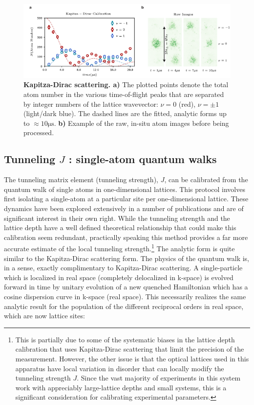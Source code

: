 \begin{figure}[t!]
		\includegraphics[width=\columnwidth]{figures/ch2/kapitza_dirac_latt_depth/KDCalv2edit.pdf} 
		\caption{\textbf{Kapitza-Dirac scattering. a)} The plotted points denote the total atom number in the various time-of-flight peaks that are separated by integer numbers of the lattice wavevector: $\nu=0$ (red), $\nu=\pm1$ (light/dark blue). The dashed lines are the fitted, analytic forms up to $\approx 10 \mathrm{\mu s}$. \textbf{b)} Example of the raw, in-situ atom images before being processed.}
		\label{fig:KDScatt}	
\end{figure}

\subsection{Tunneling $J$ : single-atom quantum walks}
\label{sec:qwcal}

The tunneling matrix element (tunneling strength), $J$, can be calibrated from the quantum walk of single atoms in one-dimensional lattices. This protocol involves first isolating a single-atom at a particular site per one-dimensional lattice. These dynamics have been explored extensively in a number of publications \cite{Hartmann2004,Lahini2012,Ahlbrecht2012,Manouchehri2014,Preiss2015} and are of significant interest in their own right. While the tunneling strength and the lattice depth have a well defined theoretical relationship that could make this calibration seem redundant, practically speaking this method provides a far more accurate estimate of the local tunneling strength.\footnote{This is partially due to some of the systematic biases in the lattice depth calibration that uses Kapitza-Dirac scattering that limit the precision of the measurement. However, the other issue is that the optical lattices used in this apparatus have local variation in disorder that can locally modify the tunneling strength $J$. Since the vast majority of experiments in this system work with appreciably large-lattice depths and small systems, this is a significant consideration for calibrating experimental parameters.} The analytic form is quite similar to the Kapitza-Dirac scattering form. The physics of the quantum walk is, in a sense, exactly complimentary to Kapitza-Dirac scattering. A single-particle which is localized in real space (completely delocalized in k-space) is evolved forward in time by unitary evolution of a new quenched Hamiltonian which has a cosine dispersion curve in k-space (real space). This necessarily realizes the same analytic result for the population of the different reciprocal orders in real space, which are now lattice sites:

